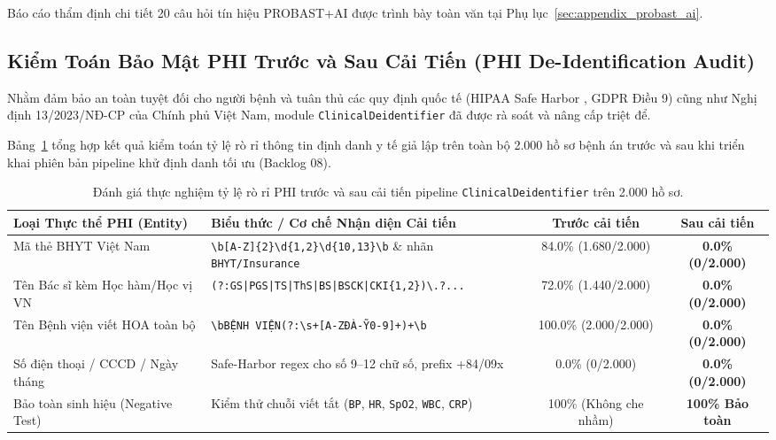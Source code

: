 Báo cáo thẩm định chi tiết 20 câu hỏi tín hiệu PROBAST+AI được trình bày toàn văn tại Phụ lục~\ref{sec:appendix_probast_ai}.

\subsection{Kiểm Toán Bảo Mật PHI Trước và Sau Cải Tiến (PHI De-Identification Audit)}
Nhằm đảm bảo an toàn tuyệt đối cho người bệnh và tuân thủ các quy định quốc tế (HIPAA Safe Harbor \cite{hhs2012hipaa}, GDPR Điều 9) cũng như Nghị định 13/2023/NĐ-CP của Chính phủ Việt Nam, module \texttt{ClinicalDeidentifier} đã được rà soát và nâng cấp triệt để.

Bảng~\ref{tab:phi_audit_comparison} tổng hợp kết quả kiểm toán tỷ lệ rò rỉ thông tin định danh y tế giả lập trên toàn bộ 2.000 hồ sơ bệnh án trước và sau khi triển khai phiên bản pipeline khử định danh tối ưu (Backlog 08).

\begin{table}[htbp]
\centering
\caption{Đánh giá thực nghiệm tỷ lệ rò rỉ PHI trước và sau cải tiến pipeline \texttt{ClinicalDeidentifier} trên 2.000 hồ sơ.}
\label{tab:phi_audit_comparison}
\footnotesize
\begin{tabularx}{\textwidth}{@{}lXcc@{}}
\toprule
\textbf{Loại Thực thể PHI (Entity)} & \textbf{Biểu thức / Cơ chế Nhận diện Cải tiến} & \textbf{Trước cải tiến} & \textbf{Sau cải tiến} \\
\midrule
Mã thẻ BHYT Việt Nam & \texttt{\textbackslash b[A-Z]\{2\}\textbackslash d\{1,2\}\textbackslash d\{10,13\}\textbackslash b} \& nhãn \texttt{BHYT/Insurance} & 84.0\% (1.680/2.000) & \textbf{0.0\% (0/2.000)} \\
Tên Bác sĩ kèm Học hàm/Học vị VN & \texttt{(?:GS|PGS|TS|ThS|BS|BSCK|CKI\{1,2\})\textbackslash.?...} & 72.0\% (1.440/2.000) & \textbf{0.0\% (0/2.000)} \\
Tên Bệnh viện viết HOA toàn bộ & \texttt{\textbackslash bBỆNH VIỆN(?:\textbackslash s+[A-ZĐÀ-Ỹ0-9]+)+\textbackslash b} & 100.0\% (2.000/2.000) & \textbf{0.0\% (0/2.000)} \\
Số điện thoại / CCCD / Ngày tháng & Safe-Harbor regex cho số 9--12 chữ số, prefix +84/09x & 0.0\% (0/2.000) & \textbf{0.0\% (0/2.000)} \\
Bảo toàn sinh hiệu (Negative Test) & Kiểm thử chuỗi viết tắt (\texttt{BP}, \texttt{HR}, \texttt{SpO2}, \texttt{WBC}, \texttt{CRP}) & 100\% (Không che nhầm) & \textbf{100\% Bảo toàn} \\
\bottomrule
\end{tabularx}
\end{table}

